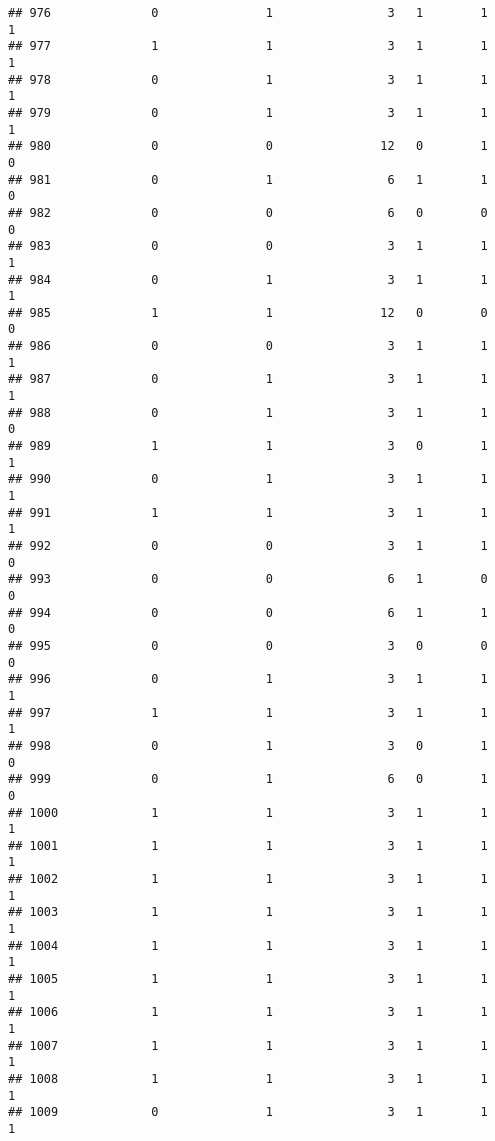 \documentclass[]{article}
\begin{document}
\begin{verbatim}
## 976              0               1                3   1        1        1
## 977              1               1                3   1        1        1
## 978              0               1                3   1        1        1
## 979              0               1                3   1        1        1
## 980              0               0               12   0        1        0
## 981              0               1                6   1        1        0
## 982              0               0                6   0        0        0
## 983              0               0                3   1        1        1
## 984              0               1                3   1        1        1
## 985              1               1               12   0        0        0
## 986              0               0                3   1        1        1
## 987              0               1                3   1        1        1
## 988              0               1                3   1        1        0
## 989              1               1                3   0        1        1
## 990              0               1                3   1        1        1
## 991              1               1                3   1        1        1
## 992              0               0                3   1        1        0
## 993              0               0                6   1        0        0
## 994              0               0                6   1        1        0
## 995              0               0                3   0        0        0
## 996              0               1                3   1        1        1
## 997              1               1                3   1        1        1
## 998              0               1                3   0        1        0
## 999              0               1                6   0        1        0
## 1000             1               1                3   1        1        1
## 1001             1               1                3   1        1        1
## 1002             1               1                3   1        1        1
## 1003             1               1                3   1        1        1
## 1004             1               1                3   1        1        1
## 1005             1               1                3   1        1        1
## 1006             1               1                3   1        1        1
## 1007             1               1                3   1        1        1
## 1008             1               1                3   1        1        1
## 1009             0               1                3   1        1        1

\end{verbatim}
\end{document}
